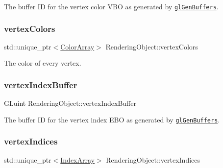 The buffer ID for the vertex color V\+BO as generated by \href{https://www.opengl.org/sdk/docs/man/html/glGenBuffers.xhtml}{\tt gl\+Gen\+Buffers}.

\hypertarget{class_rendering_object_a65fc52e665791ce55e43106b603e917a}{}\label{class_rendering_object_a65fc52e665791ce55e43106b603e917a}
\subsubsection{\texorpdfstring{vertex\+Colors}{vertexColors}}
{\footnotesize\ttfamily std\+::unique\+\_\+ptr$<$\hyperlink{class_rendering_object_a8a12e1f9be788d99af6c089e1c600022}{Color\+Array}$>$ Rendering\+Object\+::vertex\+Colors\hspace{0.3cm}{\ttfamily [protected]}}



The color of every vertex.

\hypertarget{class_rendering_object_a6740a0a0e6bd4d841c9c211f2a31cca3}{}\label{class_rendering_object_a6740a0a0e6bd4d841c9c211f2a31cca3}
\subsubsection{\texorpdfstring{vertex\+Index\+Buffer}{vertexIndexBuffer}}
{\footnotesize\ttfamily G\+Luint Rendering\+Object\+::vertex\+Index\+Buffer\hspace{0.3cm}{\ttfamily [protected]}}



The buffer ID for the vertex index E\+BO as generated by \href{https://www.opengl.org/sdk/docs/man/html/glGenBuffers.xhtml}{\tt gl\+Gen\+Buffers}.

\hypertarget{class_rendering_object_a7b84487d3c34c1ca36b2ac6060b0f802}{}\label{class_rendering_object_a7b84487d3c34c1ca36b2ac6060b0f802}
\subsubsection{\texorpdfstring{vertex\+Indices}{vertexIndices}}
{\footnotesize\ttfamily std\+::unique\+\_\+ptr$<$\hyperlink{class_rendering_object_a9931c88bca3384065c6691dfe1e60af1}{Index\+Array}$>$ Rendering\+Object\+::vertex\+Indices\hspace{0.3cm}{\ttfamily [protected]}}



